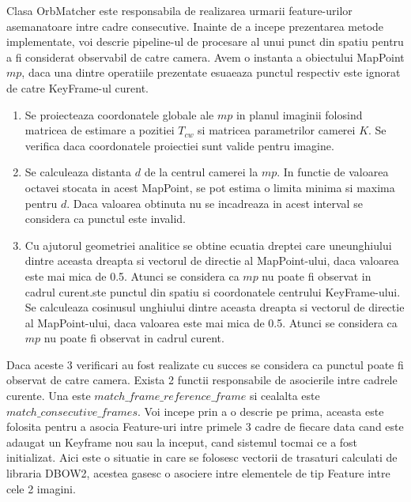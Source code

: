 \documentclass[12pt,a4paper]{report}
\begin{document}
Clasa OrbMatcher este responsabila de realizarea urmarii feature-urilor asemanatoare intre 
cadre consecutive. Inainte de a incepe prezentarea metode implementate, voi descrie
pipeline-ul de procesare al unui punct din spatiu pentru a fi considerat observabil de 
catre camera. Avem o instanta a obiectului MapPoint $ mp $, daca una dintre operatiile
prezentate esuaeaza punctul respectiv este ignorat de catre KeyFrame-ul curent.
\begin{enumerate}
    \item Se proiecteaza coordonatele globale ale $ mp $ in planul imaginii folosind matricea 
de estimare a pozitiei $ T_{cw} $ si matricea parametrilor camerei $ K $. Se verifica daca 
coordonatele proiectiei sunt valide pentru imagine.     
    \item Se calculeaza distanta $ d $ de la centrul camerei la $ mp $. In functie de valoarea 
octavei stocata in acest MapPoint, se pot estima o limita minima si maxima pentru $ d $. 
Daca valoarea obtinuta nu se incadreaza in acest interval se considera ca punctul este invalid.
    \item Cu ajutorul geometriei analitice se obtine ecuatia dreptei care uneunghiului dintre 
    aceasta dreapta si vectorul de directie al MapPoint-ului, daca valoarea este mai mica de 0.5.
    Atunci se considera ca $ mp $ nu poate fi observat in cadrul curent.ste punctul 
din spatiu si coordonatele centrului KeyFrame-ului. Se calculeaza cosinusul unghiului dintre 
aceasta dreapta si vectorul de directie al MapPoint-ului, daca valoarea este mai mica de 0.5.
Atunci se considera ca $ mp $ nu poate fi observat in cadrul curent.
\end{enumerate} 
Daca aceste 3 verificari au fost realizate cu succes se considera ca punctul poate fi observat
de catre camera. Exista 2 functii responsabile de asocierile intre cadrele curente. Una este 
$ match\_frame\_reference\_frame $ si cealalta este $ match\_consecutive\_frames $. Voi 
incepe prin a o descrie pe prima, aceasta este folosita pentru a asocia Feature-uri intre 
primele 3 cadre de fiecare data cand este adaugat un Keyframe nou sau la inceput, cand sistemul
tocmai ce a fost initializat. Aici este o situatie in care se folosesc vectorii de trasaturi
calculati de libraria DBOW2, acestea gasesc o asociere intre elementele de tip Feature intre
cele 2 imagini.
\end{document}
